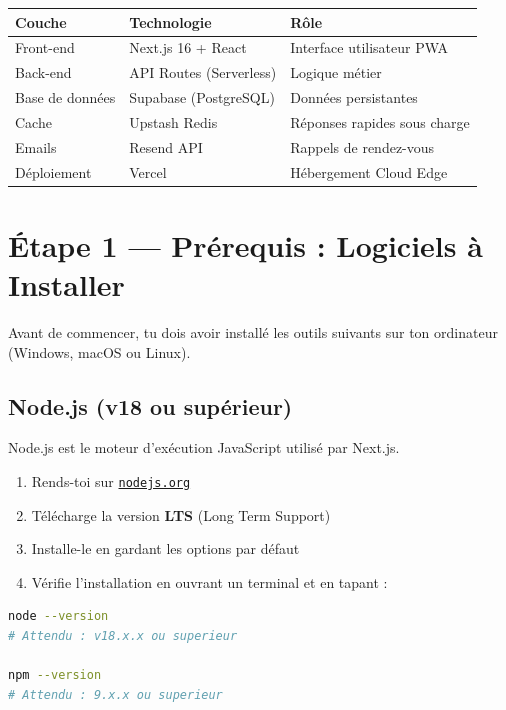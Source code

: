 \documentclass[12pt, a4paper]{article}
\begin{document}
\begin{center}
\begin{tabular}{lll}
  \toprule
  \textbf{Couche} & \textbf{Technologie} & \textbf{Rôle} \\
  \midrule
  Front-end  & Next.js 16 + React & Interface utilisateur PWA \\
  Back-end   & API Routes (Serverless) & Logique métier \\
  Base de données & Supabase (PostgreSQL) & Données persistantes \\
  Cache      & Upstash Redis & Réponses rapides sous charge \\
  Emails     & Resend API & Rappels de rendez-vous \\
  Déploiement & Vercel & Hébergement Cloud Edge \\
  \bottomrule
\end{tabular}
\end{center}

\section{Étape 1 — Prérequis : Logiciels à Installer}

Avant de commencer, tu dois avoir installé les outils suivants sur ton
ordinateur (Windows, macOS ou Linux).

\subsection{Node.js (v18 ou supérieur)}

Node.js est le moteur d'exécution JavaScript utilisé par Next.js.

\begin{enumerate}[label=\arabic*.]
  \item Rends-toi sur \href{https://nodejs.org}{\texttt{nodejs.org}}
  \item Télécharge la version \textbf{LTS} (Long Term Support)
  \item Installe-le en gardant les options par défaut
  \item Vérifie l'installation en ouvrant un terminal et en tapant :
\end{enumerate}

\begin{lstlisting}[language=bash]
node --version
# Attendu : v18.x.x ou superieur

npm --version
# Attendu : 9.x.x ou superieur
\end{lstlisting}
\end{document}
